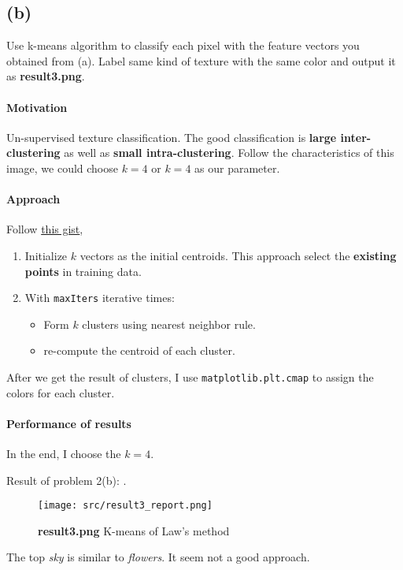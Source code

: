 \subsection{(b)}\label{2_b}
Use k-means algorithm to classify each pixel with the feature vectors you obtained from (a). Label same kind of texture with the same color and output it as \textbf{result3.png}.

\paragraph{Motivation}
Un-supervised texture classification. The good classification is \textbf{large inter-clustering} as well as \textbf{small intra-clustering}. Follow the characteristics of this image, we could choose \(k=4\) or \(k=4\) as our parameter.


\paragraph{Approach}
Follow \href{https://gist.github.com/tvwerkhoven/4fdc9baad760240741a09292901d3abd}{this gist},
\begin{enumerate}
    \item Initialize \(k\) vectors as the initial centroids. This approach select the \textbf{existing points} in training data.
    \item With \texttt{maxIters} iterative times:
	\begin{itemize}
	    \item Form \(k\) clusters using nearest neighbor rule.
	    \item re-compute the centroid of each cluster.
	\end{itemize}
\end{enumerate}
After we get the result of clusters, I use \texttt{matplotlib.plt.cmap} to assign the colors for each cluster.

\paragraph{Performance of results}
In the end, I choose the \(k=4\).

Result of problem 2(b): .
\begin{figure}
    \centering
    \texttt{[image: src/result3\_report.png]}
    \caption{\textbf{result3.png} K-means of Law's method}
    \label{result3}
\end{figure}
The top \textit{sky} is similar to \textit{flowers}. It seem not a good approach.

